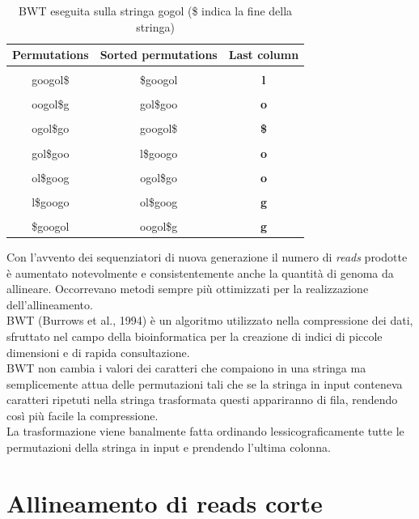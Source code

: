 \documentclass[conference]{IEEEtran}
\begin{document}
\begin{table}[!ht]
\begin{center}
\begin{tabular}{|c|c|c|}
\textbf{Permutations} & \textbf{Sorted permutations} & \textbf{Last column}\\
\hline{}
&&\\
googol\$ & \$googol & \textbf{l} \\
&&\\
oogol\$g & gol\$goo & \textbf{o} \\
&&\\
ogol\$go & googol\$ & \textbf{\$} \\
&&\\
gol\$goo & l\$googo & \textbf{o} \\
&&\\
ol\$goog & ogol\$go & \textbf{o} \\
&&\\
l\$googo & ol\$goog & \textbf{g} \\
&&\\
\$googol & oogol\$g & \textbf{g} \\

\end{tabular}
\end{center}
\caption{BWT eseguita sulla stringa gogol (\$ indica la fine della stringa)}
\end{table}

Con l'avvento dei sequenziatori di nuova generazione il numero di \textit{reads} prodotte è aumentato notevolmente e consistentemente anche la quantità di genoma da allineare. Occorrevano metodi sempre più ottimizzati per la realizzazione dell'allineamento.\\
BWT (Burrows et al., 1994) è un algoritmo utilizzato nella compressione dei dati, sfruttato nel campo della bioinformatica per la creazione di indici di piccole dimensioni e di rapida consultazione.\\

BWT non cambia i valori dei caratteri che compaiono in una stringa ma semplicemente attua delle permutazioni tali che se la stringa in input conteneva caratteri ripetuti nella stringa trasformata questi appariranno di fila, rendendo così più facile la compressione.\\
La trasformazione viene banalmente fatta ordinando lessicograficamente tutte le permutazioni della stringa in input e prendendo l'ultima colonna.

\section{\textbf{Allineamento di reads corte}}
\end{document}
